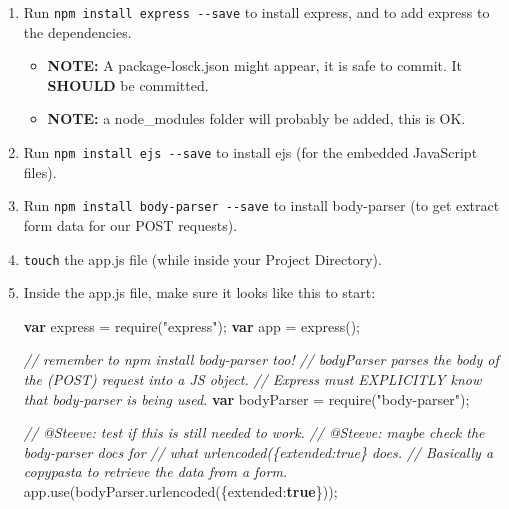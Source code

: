 \documentclass[11pt]{article}
\providecommand{\tightlist}{%
      \setlength{\itemsep}{0pt}\setlength{\parskip}{0pt}}
\newenvironment{Shaded}{}{}
\newcommand{\KeywordTok}[1]{\textcolor[rgb]{0.00,0.44,0.13}{\textbf{{#1}}}}
\newcommand{\DataTypeTok}[1]{\textcolor[rgb]{0.56,0.13,0.00}{{#1}}}
\newcommand{\StringTok}[1]{\textcolor[rgb]{0.25,0.44,0.63}{{#1}}}
\newcommand{\CommentTok}[1]{\textcolor[rgb]{0.38,0.63,0.69}{\textit{{#1}}}}
\newcommand{\NormalTok}[1]{{#1}}
\newcommand{\VariableTok}[1]{\textcolor[rgb]{0.10,0.09,0.49}{{#1}}}
\newcommand{\OperatorTok}[1]{\textcolor[rgb]{0.40,0.40,0.40}{{#1}}}
\newcommand{\AttributeTok}[1]{\textcolor[rgb]{0.49,0.56,0.16}{{#1}}}
\begin{document}
\begin{enumerate}
\def\labelenumi{\arabic{enumi}.}
\setcounter{enumi}{2}
\item
  Run \texttt{npm\ install\ express\ -\/-save} to install express, and
  to add express to the dependencies.

  \begin{itemize}
  \tightlist
  \item
    \textbf{NOTE:} A package-losck.json might appear, it is safe to
    commit. It \textbf{SHOULD} be committed.
  \item
    \textbf{NOTE:} a node\_modules folder will probably be added, this
    is OK.
  \end{itemize}
\item
  Run \texttt{npm\ install\ ejs\ -\/-save} to install ejs (for the
  embedded JavaScript files).
\item
  Run \texttt{npm\ install\ body-parser\ -\/-save} to install
  body-parser (to get extract form data for our POST requests).
\item
  \texttt{touch} the app.js file (while inside your Project Directory).
\item
  Inside the app.js file, make sure it looks like this to start:

\begin{Shaded}
\begin{Highlighting}[]
 \KeywordTok{var}\NormalTok{ express }\OperatorTok{=} \AttributeTok{require}\NormalTok{(}\StringTok{"express"}\NormalTok{)}\OperatorTok{;}
 \KeywordTok{var}\NormalTok{ app }\OperatorTok{=} \AttributeTok{express}\NormalTok{()}\OperatorTok{;}

 \CommentTok{// remember to npm install body-parser too!}
 \CommentTok{// bodyParser parses the body of the (POST) request into a JS object.}
 \CommentTok{// Express must EXPLICITLY know that body-parser is being used.}
 \KeywordTok{var}\NormalTok{ bodyParser }\OperatorTok{=} \AttributeTok{require}\NormalTok{(}\StringTok{"body-parser"}\NormalTok{)}\OperatorTok{;} 

 \CommentTok{// @Steeve: test if this is still needed to work.}
 \CommentTok{// @Steeve: maybe check the body-parser docs for}
 \CommentTok{//   what urlencoded(\{extended:true\} does.}
 \CommentTok{// Basically a copypasta to retrieve the data from a form.}
 \VariableTok{app}\NormalTok{.}\AttributeTok{use}\NormalTok{(}\VariableTok{bodyParser}\NormalTok{.}\AttributeTok{urlencoded}\NormalTok{(}\OperatorTok{\{}\DataTypeTok{extended}\OperatorTok{:}\KeywordTok{true}\OperatorTok{\}}\NormalTok{))}\OperatorTok{;}


\end{Highlighting}
\end{Shaded}
\end{enumerate}
\end{document}
